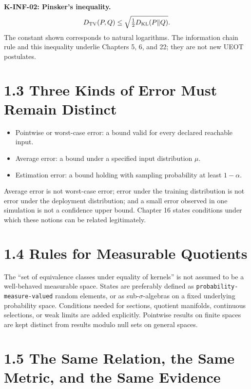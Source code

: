 \documentclass[
  english,
  11pt,
  oneside]{book}
\providecommand{\tightlist}{%
  \setlength{\itemsep}{0pt}\setlength{\parskip}{0pt}}
\begin{document}
\textbf{K-INF-02: Pinsker's inequality.} \[D_{\rm TV}(P,Q)\le\sqrt{\tfrac12D_{\rm KL}(P\|Q)}.\] The constant shown corresponds to natural logarithms. The information chain rule and this inequality underlie Chapters 5, 6, and 22; they are not new UEOT postulates.

\section{1.3 Three Kinds of Error Must Remain Distinct}\label{three-kinds-of-error-must-remain-distinct}

\begin{itemize}
\tightlist
\item
  Pointwise or worst-case error: a bound valid for every declared reachable input.
\item
  Average error: a bound under a specified input distribution \(\mu\).
\item
  Estimation error: a bound holding with sampling probability at least \(1-\alpha\).
\end{itemize}

Average error is not worst-case error; error under the training distribution is not error under the deployment distribution; and a small error observed in one simulation is not a confidence upper bound. Chapter 16 states conditions under which these notions can be related legitimately.

\section{1.4 Rules for Measurable Quotients}\label{rules-for-measurable-quotients}

The ``set of equivalence classes under equality of kernels'' is not assumed to be a well-behaved measurable space. States are preferably defined as \nolinkurl{probability-measure-valued} random elements, or as sub-\(\sigma\)-algebras on a fixed underlying probability space. Conditions needed for sections, quotient manifolds, continuous selections, or weak limits are added explicitly. Pointwise results on finite spaces are kept distinct from results modulo null sets on general spaces.

\section{1.5 The Same Relation, the Same Metric, and the Same Evidence}\label{the-same-relation-the-same-metric-and-the-same-evidence}
\end{document}
